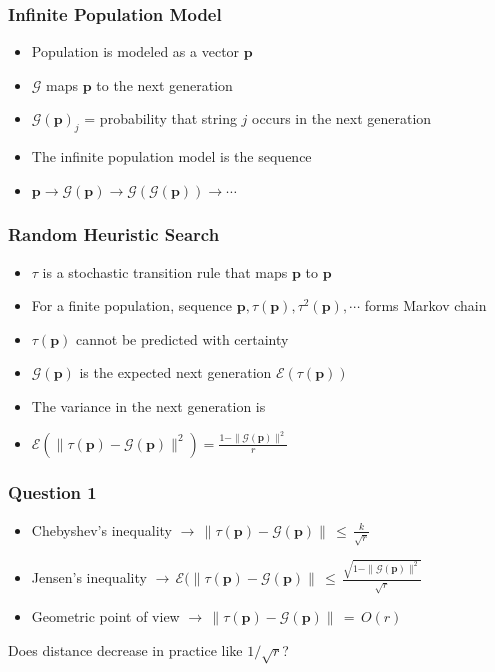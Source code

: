 \documentclass[pdf]{beamer}
\begin{document}
  \begin{frame}
    \frametitle{Infinite Population Model}
    \begin{itemize}
      \item{Population is modeled as a vector $\bm{p}$}
      \item{$\mathcal{G}$ maps $\bm{p}$ to the next generation}
      \item{$\mathcal{G}(\bm{p})_j$ =  probability that string $j$ occurs in the next generation}
      \item{The infinite population model is the sequence }
      \item{$\bm{p} \to \mathcal{G}(\bm{p}) \to  {\mathcal{G}}(\mathcal{G}(\bm{p})) \to \cdots $}
    \end{itemize}  
  \end{frame}
  
  \begin{frame}
    \frametitle{Random Heuristic Search}
    \begin{itemize}
      \item{$\tau$ is a stochastic transition rule that maps $\bm{p}$ to $\bm{p}$}
      \item{For a finite population, sequence $\bm{p}, \tau(\bm{p}), \tau^2(\bm{p}), \cdots $ forms Markov chain}
      \item{$\tau(\bm{p})$ cannot be predicted with certainty }
      \item{$\mathcal{G}(\bm{p})$ is the expected next generation $\mathcal{E}(\tau(\bm{p}))$}
      \item{The variance in the next generation  is}
      \item{
	$\mathcal{E}(\| \tau (\bm{p}) - \mathcal{G}(\bm{p}) \|^2) = \frac{1 - \|\mathcal{G}(\bm{p})\|^2}{r}$
      }
    \end{itemize}
  \end{frame}
  
  \begin{frame}
    \frametitle{Question 1}
    \begin{itemize}
      \item{Chebyshev's inequality $\to\, \| \tau (\bm{p}) - \mathcal{G}(\bm{p}) \| \,\leq\, \frac{k}{\sqrt{r}} $ }
      \item{Jensen's inequality  
      $\to\, \mathcal{E}(\| \tau (\bm{p}) - \mathcal{G}(\bm{p}) \| \,\leq\, \frac{\sqrt{1 - \|\mathcal{G}(\bm{p})\|^2}}{\sqrt{r}} $}
      \item{Geometric point of view $\to\, \| \tau (\bm{p}) - \mathcal{G}(\bm{p}) \| \,=\, O(r) $ }      
    \end{itemize}
    Does distance decrease in practice like $1/\sqrt{r}$?
  \end{frame}
  
\end{document}

